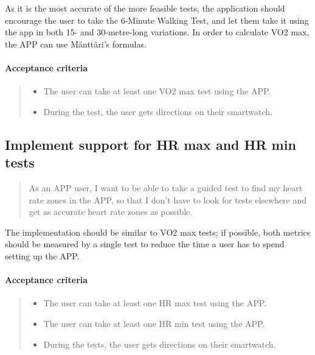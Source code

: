 As it is the most accurate of the more feasible tests, the application should encourage the user to take the 6-Minute Walking Test, and let them take it using the app in both 15- and 30-metre-long variations.
In order to calculate VO2 max, the APP can use Mänttäri's formulas.

\paragraph*{Acceptance criteria}
\begin{quote}
\begin{itemize}
    \item The user can take at least one VO2 max test using the APP.
    \item During the test, the user gets directions on their smartwatch.
\end{itemize}
\end{quote}

\subsection{Implement support for HR max and HR min tests}\label{US:fit-HR}
\begin{quote}
As an APP user, I want to be able to take a guided test to find my heart rate zones in the APP, so that I don't have to look for tests elsewhere and get as accurate heart rate zones as possible.
\end{quote}

The implementation should be similar to VO2 max tests; if possible, both metrics should be measured by a single test to reduce the time a user has to spend setting up the APP.

\paragraph*{Acceptance criteria}
\begin{quote}
\begin{itemize}
    \item The user can take at least one HR max test using the APP.
    \item The user can take at least one HR min test using the APP.
    \item During the tests, the user gets directions on their smartwatch.
\end{itemize}
\end{quote}


